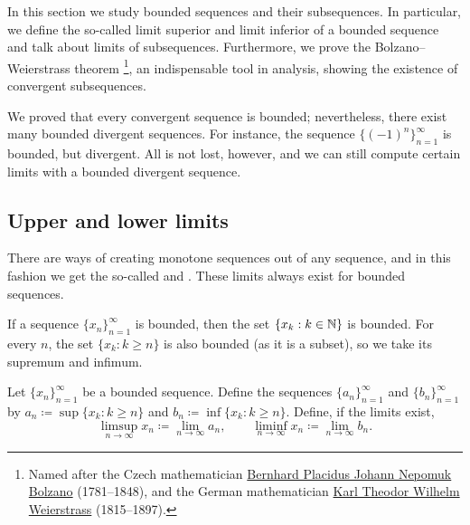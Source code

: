 
In this section we study bounded sequences and their subsequences.
In particular, we define the so-called limit superior and limit inferior
of a bounded sequence and talk about limits of subsequences.
Furthermore, we prove the
Bolzano--Weierstrass theorem%
\footnote{%
Named after the Czech mathematician
\href{https://en.wikipedia.org/wiki/Bernard_Bolzano}{Bernhard Placidus Johann Nepomuk Bolzano}
(1781--1848), and the German mathematician
\href{https://en.wikipedia.org/wiki/Karl_Weierstrass}{Karl Theodor Wilhelm Weierstrass}
(1815--1897).}, an
indispensable tool in analysis, showing the existence of convergent
subsequences.

We proved that every convergent sequence is bounded; nevertheless,
there exist many bounded divergent sequences.  For instance,
the sequence $\bigl\{ {(-1)}^n \bigr\}_{n=1}^\infty$ is bounded,
but divergent.  All is not lost, however, and we can
still compute certain limits with a bounded divergent sequence.

\subsection{Upper and lower limits}

There are ways of creating monotone sequences out of any sequence, and
in this fashion we
get the so-called \emph{} and
\emph{}.  These limits always exist for bounded
sequences.

If a sequence $\{ x_n \}_{n=1}^\infty$ is bounded, then 
the set $\{ x_k : k \in {\mathbb{N}} \}$ is bounded.  For every $n$,
the set $\{ x_k : k \geq n \}$ is also bounded (as it is a subset), so we
take its supremum and infimum.

\begin{defn} \label{liminflimsup:def}
Let $\{ x_n \}_{n=1}^\infty$ be a bounded sequence.  Define the sequences
$\{ a_n \}_{n=1}^\infty$
and $\{ b_n \}_{n=1}^\infty$ by
$a_n \coloneqq \sup \{ x_k : k \geq n \}$ and
$b_n \coloneqq \inf \{ x_k : k \geq n \}$.  
Define, if the limits exist,
\begin{equation*}
\limsup_{n \to \infty} x_n \coloneqq \lim_{n \to \infty} a_n ,
\qquad
\liminf_{n \to \infty} x_n \coloneqq \lim_{n \to \infty} b_n .
\end{equation*}
\end{defn}


